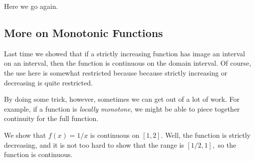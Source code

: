 














Here we go again.

\subsection{More on Monotonic Functions}
Last time we showed that if a strictly increasing function has image an interval on an interval, then the function is continuous on the domain interval. Of course, the use here is somewhat restricted because because strictly increasing or decreasing is quite restricted.

By doing some trick, however, sometimes we can get out of a lot of work. For example, if a function is \textit{locally monotone}, we might be able to piece together continuity for the full function.
\begin{example}
	We show that $f(x)=1/x$ is continuous on $[1,2].$ Well, the function is strictly decreasing, and it is not too hard to show that the range is $[1/2,1],$ so the function is continuous.
\end{example}

